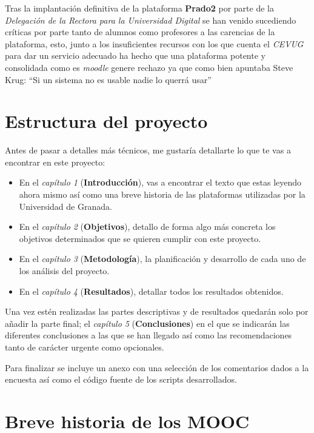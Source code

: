 \bigskip
Tras la implantación definitiva de la plataforma \textbf{Prado2} por parte de la \textit{Delegación de la Rectora para la Universidad Digital} se han venido sucediendo críticas por parte tanto de alumnos como profesores a las carencias de la plataforma, esto, junto a los insuficientes recursos con los que cuenta el \textit{CEVUG} para dar un servicio adecuado ha hecho que una plataforma potente y consolidada como es \textit{moodle} genere rechazo ya que como bien apuntaba Steve Krug: ``Si un sistema no es usable nadie lo querrá usar''\cite{stevekrug}


\section{Estructura del proyecto}


\bigskip
Antes de pasar a detalles más técnicos, me gustaría detallarte lo que te vas a encontrar en este proyecto:

\begin{itemize}
  \item En el \textit{capítulo 1} (\textbf{Introducción}), vas a encontrar el texto que estas leyendo ahora mismo así como una breve historia de las plataformas utilizadas por la Universidad de Granada.
  \item En el \textit{capítulo 2} (\textbf{Objetivos}), detallo de forma algo más concreta los objetivos determinados que se quieren cumplir con este proyecto.
  \item En el \textit{capítulo 3} (\textbf{Metodología}), la planificación y desarrollo de cada uno de los análisis del proyecto.
  \item En el \textit{capítulo 4} (\textbf{Resultados}), detallar todos los resultados obtenidos.
\end{itemize}

\bigskip
Una vez estén realizadas las partes descriptivas y de resultados quedarán solo por añadir la parte final; el \textit{capítulo 5} (\textbf{Conclusiones}) en el que se indicarán las diferentes conclusiones a las que se han llegado así como las recomendaciones tanto de carácter urgente como opcionales.

\bigskip
Para finalizar se incluye un anexo con una selección de los comentarios dados a la encuesta así como el código fuente de los scripts desarrollados.

\section{Breve historia de los MOOC}

